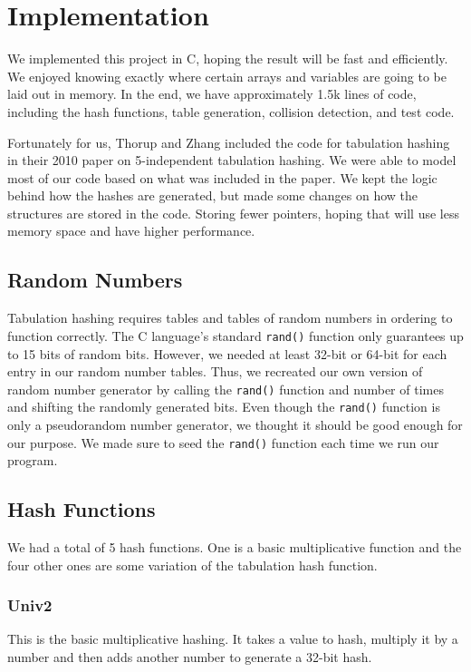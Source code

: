 \documentclass[11pt]{article}
\begin{document}
\section{Implementation}

We implemented this project in C, hoping the result will be fast and efficiently.
We enjoyed knowing exactly where certain arrays and variables are going to
be laid out in memory. In the end, we have approximately 1.5k lines of code,
including the hash functions, table generation, collision detection, and test code.

Fortunately for us, Thorup and Zhang included the code for tabulation hashing in their
2010 paper on 5-independent tabulation hashing. We were able to model most of our
code based on what was included in the paper. We kept the logic behind how the hashes
are generated, but made some changes on how the structures are stored in the code. 
Storing fewer pointers, hoping that will use less memory space and have higher performance.

\subsection{Random Numbers}

Tabulation hashing requires tables and tables of random numbers in ordering 
to function correctly. The C language's standard \texttt{rand()} function only
guarantees up to 15 bits of random bits. However, we needed at least 32-bit
or 64-bit for each entry in our random number tables. Thus, we recreated our 
own version of random number generator by calling the \texttt{rand()} function
and number of times and shifting the randomly generated bits. Even though
the \texttt{rand()} function is only a pseudorandom number generator, we thought
it should be good enough for our purpose. We made sure to seed 
the \texttt{rand()} function each time we run our program.

\subsection{Hash Functions}
We had a total of 5 hash functions. One is a basic multiplicative function and the four other ones are some variation of the tabulation hash function.
\subsubsection{Univ2}
This is the basic multiplicative hashing. It takes a value to hash, multiply it by a number
and then adds another number to generate a 32-bit hash. 
\end{document}
